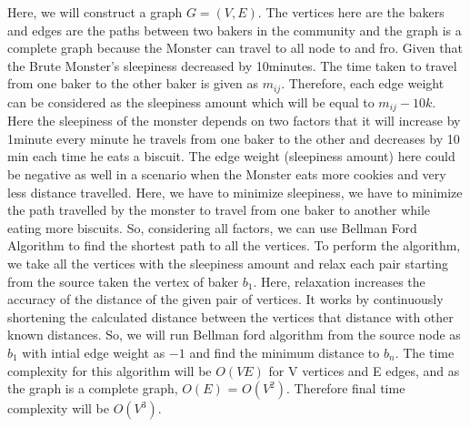 \documentclass[12pt,twoside]{article}
\begin{document}
\begin{problems}
\begin{problemparts}
\end{problemparts}

\newpage
\problem  %
Here, we will construct a graph $G = (V,E)$. The vertices here are the bakers and edges are the paths between two bakers in the community and the graph is a complete graph because the Monster can travel to all node to and fro. Given that the Brute Monster's sleepiness decreased by 10minutes. The time taken to travel from one baker to the other baker is given as $m_{ij}$. Therefore, each edge weight can be considered as the sleepiness amount which will be equal to $m_{ij} - 10k$. Here the sleepiness of the monster depends on two factors that it will increase by 1minute every minute he travels from one baker to the other and decreases by 10 min each time he eats a biscuit. The edge weight (sleepiness amount) here could be negative as well in a scenario when the Monster eats more cookies and very less distance travelled. Here, we have to minimize sleepiness, we have to minimize the path travelled by the monster to travel from one baker to another while eating more biscuits. So, considering all factors, we can use Bellman Ford Algorithm to find the shortest path to all the vertices. To perform the algorithm, we take all the vertices with the sleepiness amount and relax each pair starting from the source taken the vertex of baker $b_1$. Here, relaxation increases the accuracy of the distance of the given pair of vertices. It works by continuously shortening the calculated distance between the vertices that distance with other known distances. So, we will run Bellman ford algorithm from the source node as $b_1$ with intial edge weight as $-1$ and find the minimum distance to $b_n$. The time complexity for this algorithm will be $O(VE)$ for V vertices and E edges, and as the graph is a complete graph, $O(E)$ = $O(V^2)$. Therefore final time complexity will be $O(V^3)$.










\end{problems}
\end{document}
